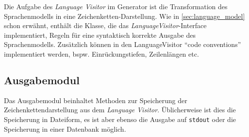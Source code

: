 Die Aufgabe des \emph{Language Visitor} im Generator ist die Transformation des Sprachenmodells in eine Zeichenketten-Darstellung. Wie in \cref{sec:language_model} schon erwähnt, enthält die Klasse, die das \emph{LanguageVisitor}-Interface implementiert, Regeln für eine syntaktisch korrekte Ausgabe des Sprachenmodells. Zusätzlich können in den LanguageVisitor \enquote{code conventions} implementiert werden, bspw. Einrückungstiefen, Zeilenlängen etc.

\subsection{Ausgabemodul}
\label{sec:printer_module}

Das Ausgabemodul beinhaltet Methoden zur Speicherung der Zeichenkettendarstellung aus dem \emph{Language Visitor}. Üblicherweise ist dies die Speicherung in Dateiform, es ist aber ebenso die Ausgabe auf \texttt{stdout} oder die Speicherung in einer Datenbank möglich.
